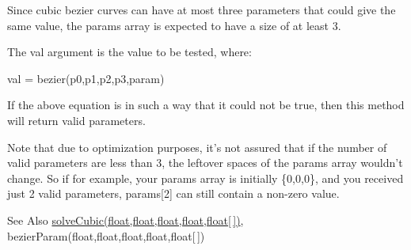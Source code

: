 Since cubic bezier curves can have at most three parameters that could give the same value, the {\ttfamily params} array is expected to have a size of at least 3.

The {\ttfamily val} argument is the value to be tested, where\-: \begin{DoxyVerb}val = bezier(p0,p1,p2,p3,param)
\end{DoxyVerb}


If the above equation is in such a way that it could not be true, then this method will return {} valid parameters.

Note that due to optimization purposes, it's not assured that if the number of valid parameters are less than 3, the leftover spaces of the {\ttfamily params} array wouldn't change. So if for example, your {\ttfamily params} array is initially {\ttfamily \{0,0,0\}}, and you received just 2 valid parameters, {\ttfamily params\mbox{[}2\mbox{]}} can still contain a non-\/zero value.

\begin{DoxySeeAlso}{See Also}
\hyperlink{classhype_1_1core_1_1util_1_1_h_math_a67854709c53bde506d4b6b25e402dd51}{solve\-Cubic(float,float,float,float,float\mbox{[}$\,$\mbox{]})}, bezier\-Param(float,float,float,float,float\mbox{[}$\,$\mbox{]}) 
\end{DoxySeeAlso}

